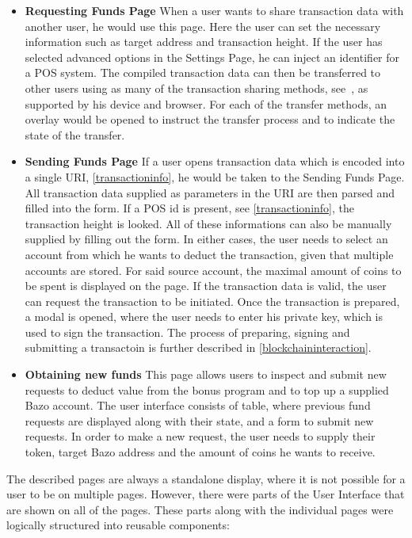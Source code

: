\begin{itemize}
\item \textbf{Requesting Funds Page}
When a user wants to share transaction data with another user, he would use this page. Here the user can set the necessary information such as target address and transaction height. If the user has selected advanced options in the Settings Page, he can inject an identifier for a POS system. 
The compiled transaction data can then be transferred to other users using as many of the transaction sharing methods, see \cite{undefined}, as supported by his device and browser. For each of the transfer methods, an overlay would be opened to instruct the transfer process and to indicate the state of the transfer.
\item \textbf{Sending Funds Page}
If a user opens transaction data which is encoded into a single URI, \ref{transactioninfo}, he would be taken to the Sending Funds Page.
All transaction data supplied as parameters in the URI are then parsed and filled into the form. If a POS id is present, see \ref{transactioninfo}, the transaction height is looked. All of these informations can also be manually supplied by filling out the form. In either cases, the user needs to select an account from which he wants to deduct the transaction, given that multiple accounts are stored. For said source account, the maximal amount of coins to be spent is displayed on the page. If the transaction data is valid, the user can request the transaction to be initiated. Once the transaction is prepared, a modal is opened, where the user needs to enter his private key, which is used to sign the transaction. The process of preparing, signing and submitting a transactoin is further described in \ref{blockchaininteraction}.
\item \textbf{Obtaining new funds}
This page allows users to inspect and submit new requests to deduct value from the bonus program and to top up a supplied Bazo account.
The user interface consists of table, where previous fund requests are displayed along with their state, and a form to submit new requests. In order to make a new request, the user needs to supply their token, target Bazo address and the amount of coins he wants to receive. 
\end{itemize}
The described pages are always a standalone display, where it is not possible for a user to be on multiple pages. However, there were parts of the User Interface that are shown on all of the pages. These parts along with the individual pages were logically structured into reusable components:
